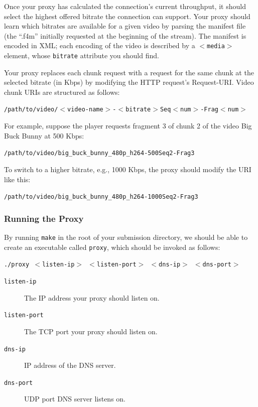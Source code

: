 \documentclass{article}
\begin{document}
Once your proxy has calculated the connection's current throughput, it should
select the highest offered bitrate the connection can support. Your proxy
should learn which bitrates are available for a given video by parsing the
manifest file (the ``.f4m'' initially requested at the beginning of the
stream). The manifest is encoded in XML; each encoding of the video is
described by a \texttt{$<$media$>$} element, whose \texttt{bitrate} attribute
you should find.

Your proxy replaces each chunk request with a request for the same chunk at the
selected bitrate (in Kbps) by modifying the HTTP request's Request-URI. Video
chunk URIs are structured as follows:
\begin{center}
	\texttt{/path/to/video/$<$video-name$>$-$<$bitrate$>$Seq$<$num$>$-Frag$<$num$>$}
\end{center}

For example, suppose the player requests fragment 3 of chunk 2 of the video Big
Buck Bunny at 500 Kbps:
\begin{center}
	\texttt{/path/to/video/big\_buck\_bunny\_480p\_h264-500Seq2-Frag3}
\end{center}
To switch to a higher bitrate, e.g., 1000 Kbps, the proxy should modify the URI
like this:
\begin{center}
	\texttt{/path/to/video/big\_buck\_bunny\_480p\_h264-1000Seq2-Frag3}
\end{center}


\subsubsection{Running the Proxy}

By running \texttt{make} in the root of your
submission directory, we should be able to create an executable called
\texttt{proxy}, which should be invoked as follows:
\begin{center}
	\texttt{./proxy $<$listen-ip$>$ $<$listen-port$>$ $<$dns-ip$>$ $<$dns-port$>$}
\end{center}

\begin{description}
	\item[\texttt{listen-ip}] The IP address your proxy should listen on.
	\item[\texttt{listen-port}] The TCP port your proxy should listen on.
	\item[\texttt{dns-ip}] IP address of the DNS server.
	\item[\texttt{dns-port}] UDP port DNS server listens on.
\end{description}
\end{document}
